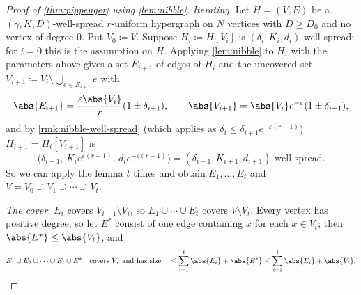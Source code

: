 \begin{proof}[Proof of \autoref{thm:pippenger} using \autoref{lem:nibble}]
    \emph{Iterating.} Let \(H = (V, E)\) be a \((\gamma, K, D)\)-well-spread \(r\)-uniform hypergraph on \(N\) vertices with \(D \ge D_{0}\) and no vertex of degree \(0\). Put \(V_{0} \coloneqq V\). Suppose \(H_{i} \coloneqq H[V_{i}]\) is \((\delta_{i}, K_{i}, d_{i})\)-well-spread; for \(i = 0\) this is the assumption on \(H\). Applying \autoref{lem:nibble} to \(H_{i}\) with the parameters above gives a set \(E_{i+1}\) of edges of \(H_{i}\) and the uncovered set \(V_{i+1} \coloneqq V_{i} \setminus \bigcup_{e \in E_{i+1}} e\) with
    \begin{equation}\label{eq:pippenger-step}
        \abs{E_{i+1}} = \frac{\varepsilon \abs{V_{i}}}{r} (1 \pm \delta_{i+1}),
        \qquad
        \abs{V_{i+1}} = \abs{V_{i}} e^{-\varepsilon} (1 \pm \delta_{i+1}),
    \end{equation}
    and by \autoref{rmk:nibble-well-spread} (which applies as \(\delta_{i} \le \delta_{i+1} e^{-\varepsilon(r-1)}\)) \(H_{i+1} = H_{i}[V_{i+1}]\) is
    \[
        \bigl( \delta_{i+1},\, K_{i} e^{\varepsilon(r-1)},\, d_{i} e^{-\varepsilon(r-1)} \bigr) = (\delta_{i+1}, K_{i+1}, d_{i+1})\text{-well-spread}.
    \] So we can apply the lemma \(t\) times and obtain \(E_{1}, \ldots, E_{t}\) and \(V = V_{0} \supseteq V_{1} \supseteq \cdots \supseteq V_{t}\).

    \emph{The cover.} \(E_{i}\) covers \(V_{i-1} \setminus V_{i}\), so \(E_{1} \cup \cdots \cup E_{t}\) covers \(V \setminus V_{t}\). Every vertex has positive degree, so let \(E^{*}\) consist of one edge containing \(x\) for each \(x \in V_{t}\); then \(\abs{E^{*}} \le \abs{V_{t}}\), and
    \[
        E_{1} \cup E_{2} \cup \cdots \cup E_{t} \cup E^{*}
        \quad\text{covers } V, \text{ and has size}\quad
        \le \sum_{i=1}^{t} \abs{E_{i}} + \abs{E^{*}} \le \sum_{i=1}^{t} \abs{E_{i}} + \abs{V_{t}} .
    \]


\end{proof}
